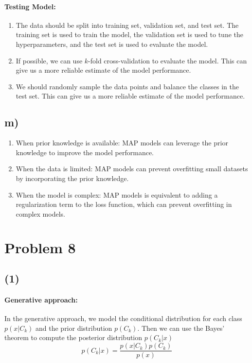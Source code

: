 \documentclass[a4paper,12pt]{article}
\begin{document}
\paragraph{Testing Model:}
\begin{enumerate}
	\item The data should be split into training set, validation set, and test set. The training set is used to train the model, the validation set is used to tune the hyperparameters, and the test set is used to evaluate the model.
	\item If possible, we can use $k$-fold cross-validation to evaluate the model. This can give us a more reliable estimate of the model performance.
	\item We should randomly sample the data points and balance the classes in the test set. This can give us a more reliable estimate of the model performance.
\end{enumerate}

\subsection*{m)}

\begin{enumerate}
	\item When prior knowledge is available: MAP models can leverage the prior knowledge to improve the model performance.
	\item When the data is limited: MAP models can prevent overfitting small datasets by incorporating the prior knowledge.
	\item When the model is complex: MAP models is equivalent to adding a regularization term to the loss function, which can prevent overfitting in complex models.
\end{enumerate}

\section*{Problem 8}

\subsection*{(1)}

\paragraph{Generative approach:}

In the generative approach, we model the conditional distribution for each class $p(x|C_k)$ and the prior distribution $p(C_k)$. Then we can use the Bayes' theorem to compute the posterior distribution $p(C_k|x)$
\begin{equation*}
	p(C_k|x) = \frac{p(x|C_k) p(C_k)}{p(x)}
\end{equation*}
\end{document}
